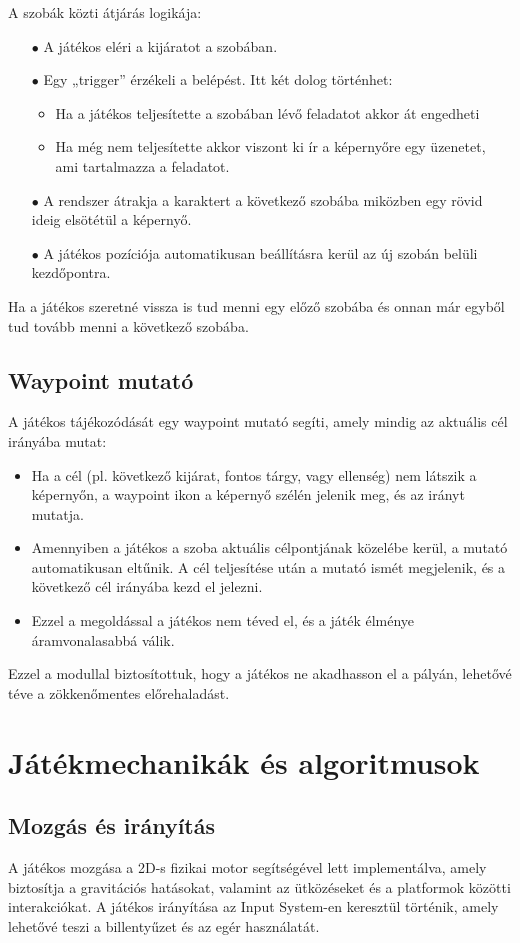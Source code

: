 \documentclass[
]{thesis-ekf}
\theoremstyle{definition}
\theoremstyle{remark}
\begin{document}
A szobák közti átjárás logikája:
\begin{itemize}
	\item[$\bullet$] A játékos eléri a kijáratot a szobában.
	\item[$\bullet$] Egy „trigger” érzékeli a belépést. Itt két dolog történhet:\\
	\begin{itemize}
		\item Ha a játékos teljesítette a szobában lévő feladatot akkor át engedheti
		\item Ha még nem teljesítette akkor viszont ki ír a képernyőre egy üzenetet, ami tartalmazza a feladatot.
	\end{itemize}
	\item[$\bullet$] A rendszer átrakja a karaktert a következő szobába miközben egy rövid ideig elsötétül a képernyő.
	\item[$\bullet$] A játékos pozíciója automatikusan beállításra kerül az új szobán belüli kezdőpontra.
\end{itemize}
Ha a játékos szeretné vissza is tud menni egy előző szobába és onnan már egyből tud tovább menni a következő szobába.

\subsection{Waypoint mutató}
A játékos tájékozódását egy waypoint mutató segíti, amely mindig az aktuális cél irányába mutat:
\begin{itemize}
	\item Ha a cél (pl. következő kijárat, fontos tárgy, vagy ellenség) nem látszik a képernyőn, a waypoint ikon a képernyő szélén jelenik meg, és az irányt mutatja.
	\item Amennyiben a játékos a szoba aktuális célpontjának közelébe kerül, a mutató automatikusan eltűnik. A cél teljesítése után a mutató ismét megjelenik, és a következő cél irányába kezd el jelezni.
	\item Ezzel a megoldással a játékos nem téved el, és a játék élménye áramvonalasabbá válik.
\end{itemize}
Ezzel a modullal biztosítottuk, hogy a játékos ne akadhasson el a pályán, lehetővé téve a zökkenőmentes előrehaladást.

\section{Játékmechanikák és algoritmusok}
\subsection{Mozgás és irányítás}
A játékos mozgása a 2D-s fizikai motor segítségével lett implementálva, amely biztosítja a gravitációs hatásokat, valamint az ütközéseket és a platformok közötti interakciókat. A játékos irányítása az Input System-en keresztül történik, amely lehetővé teszi a billentyűzet és az egér használatát.
\end{document}
